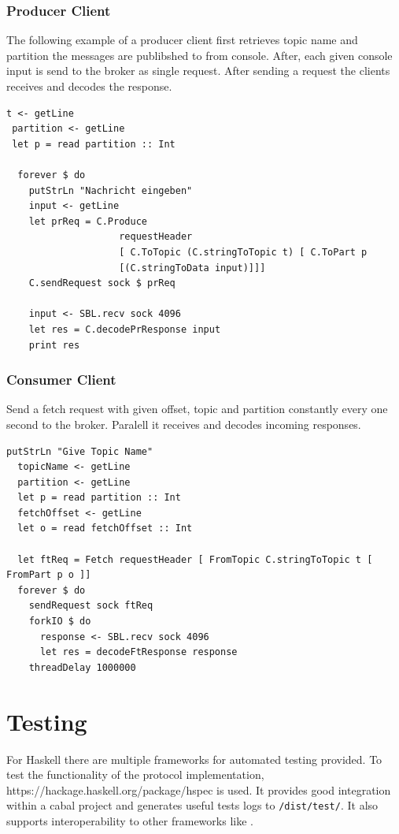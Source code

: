 \subsubsection{Producer Client}
The following example of a producer client first retrieves topic name
and partition the messages are publibshed to from console. After, each given
console input is send to the broker as single request. After sending
a request the clients receives and decodes the response.
\begin{lstlisting}[caption={Producer client example}]
 t <- getLine
 partition <- getLine
 let p = read partition :: Int

  forever $ do 
    putStrLn "Nachricht eingeben"
    input <- getLine
    let prReq = C.Produce 
                    requestHeader
                    [ C.ToTopic (C.stringToTopic t) [ C.ToPart p
                    [(C.stringToData input)]]]
    C.sendRequest sock $ prReq

    input <- SBL.recv sock 4096
    let res = C.decodePrResponse input
    print res
\end{lstlisting}

\subsubsection{Consumer Client}
Send a fetch request with given offset, topic and partition constantly every one
second to the broker. Paralell it receives and decodes incoming responses.
\begin{lstlisting}[caption={Consumer client example}]
putStrLn "Give Topic Name"
  topicName <- getLine
  partition <- getLine
  let p = read partition :: Int
  fetchOffset <- getLine
  let o = read fetchOffset :: Int

  let ftReq = Fetch requestHeader [ FromTopic C.stringToTopic t [ FromPart p o ]]
  forever $ do
    sendRequest sock ftReq
    forkIO $ do
      response <- SBL.recv sock 4096
      let res = decodeFtResponse response
    threadDelay 1000000
\end{lstlisting}

\newpage
\section{Testing}
For Haskell there are multiple frameworks for automated testing provided. To
test the functionality of the protocol implementation, 
{https://hackage.haskell.org/package/hspec} is used. It provides good
integration within a cabal project
and generates useful tests logs to \lstinline{/dist/test/}. It also supports
interoperability to other frameworks like
.

